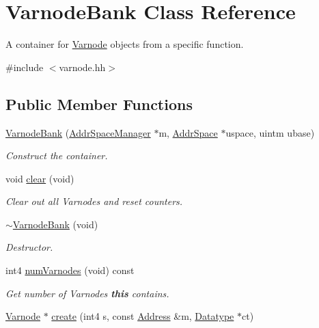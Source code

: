 \hypertarget{class_varnode_bank}{}\section{Varnode\+Bank Class Reference}
\label{class_varnode_bank}


A container for \mbox{\hyperlink{class_varnode}{Varnode}} objects from a specific function.  




{\ttfamily \#include $<$varnode.\+hh$>$}

\subsection*{Public Member Functions}
\begin{DoxyCompactItemize}
\item 
\mbox{\hyperlink{class_varnode_bank_a146fadaeb5504c61639d4d9ec9ddb98e}{Varnode\+Bank}} (\mbox{\hyperlink{class_addr_space_manager}{Addr\+Space\+Manager}} $\ast$m, \mbox{\hyperlink{class_addr_space}{Addr\+Space}} $\ast$uspace, uintm ubase)
\begin{DoxyCompactList}\small\item\em Construct the container. \end{DoxyCompactList}\item 
void \mbox{\hyperlink{class_varnode_bank_addcb9e8b2e8d92552c2b142eeacb6f75}{clear}} (void)
\begin{DoxyCompactList}\small\item\em Clear out all Varnodes and reset counters. \end{DoxyCompactList}\item 
\mbox{\hyperlink{class_varnode_bank_afa3b1db96511f8c7481ab67b9e39d36c}{$\sim$\+Varnode\+Bank}} (void)
\begin{DoxyCompactList}\small\item\em Destructor. \end{DoxyCompactList}\item 
int4 \mbox{\hyperlink{class_varnode_bank_a312d84cc67e7a0f52cd534b1ca3d5b3c}{num\+Varnodes}} (void) const
\begin{DoxyCompactList}\small\item\em Get number of Varnodes {\bfseries{this}} contains. \end{DoxyCompactList}\item 
\mbox{\hyperlink{class_varnode}{Varnode}} $\ast$ \mbox{\hyperlink{class_varnode_bank_ae2effd128dce9205fba1015b45959f1c}{create}} (int4 s, const \mbox{\hyperlink{class_address}{Address}} \&m, \mbox{\hyperlink{class_datatype}{Datatype}} $\ast$ct)

\end{DoxyCompactItemize}

